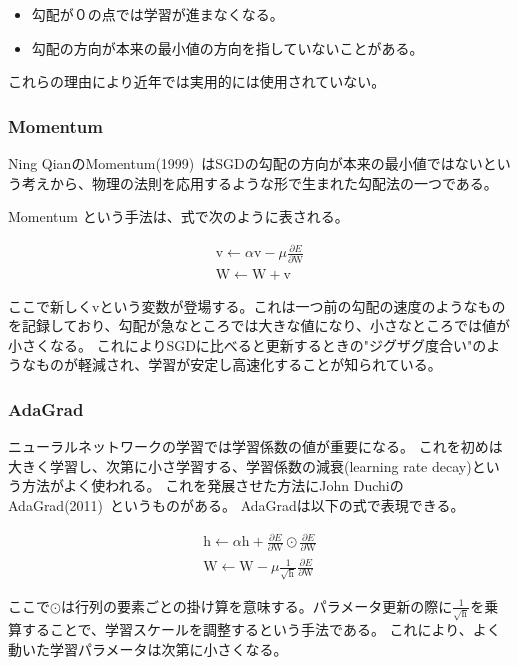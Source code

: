 \begin{itemize}
  \item 勾配が０の点では学習が進まなくなる。
  \item 勾配の方向が本来の最小値の方向を指していないことがある。
\end{itemize}
これらの理由により近年では実用的には使用されていない。

\subsubsection{Momentum}

Ning QianのMomentum(1999)~\cite{momentum}はSGDの勾配の方向が本来の最小値ではないという考えから、物理の法則を応用するような形で生まれた勾配法の一つである。


Momentum という手法は、式で次のように表される。

\begin{eqnarray}
    \mathrm{v} \leftarrow \alpha \mathrm{v} - \mu \frac {\partial E }{\partial \mathrm{W}} \\
    \mathrm{W} \leftarrow \mathrm{W+v}
\label{eq:momentum}
\end{eqnarray}

ここで新しく$ \mathrm{v} $という変数が登場する。これは一つ前の勾配の速度のようなものを記録しており、勾配が急なところでは大きな値になり、小さなところでは値が小さくなる。
これによりSGDに比べると更新するときの"ジグザグ度合い"のようなものが軽減され、学習が安定し高速化することが知られている。


\subsubsection{AdaGrad}

ニューラルネットワークの学習では学習係数の値が重要になる。
これを初めは大きく学習し、次第に小さ学習する、学習係数の減衰(learning rate decay)という方法がよく使われる。
これを発展させた方法にJohn DuchiのAdaGrad(2011)~\cite{adagrad}というものがある。
AdaGradは以下の式で表現できる。

\begin{eqnarray}　
    \mathrm{h} \leftarrow \alpha \mathrm{h} + \frac {\partial E }{\partial \mathrm{W}} \odot \frac {\partial E }{\partial \mathrm{W}}  \\
    \mathrm{W} \leftarrow \mathrm{W}  - \mu \frac{ 1 }{\sqrt{\mathrm{h}}} \frac{ \partial E }{\partial \mathrm{W}} 
\label{eq:adagrad}
\end{eqnarray}

ここで$ \odot $は行列の要素ごとの掛け算を意味する。パラメータ更新の際に$ \frac{ 1 }{\sqrt{\mathrm{h}}} $を乗算することで、学習スケールを調整するという手法である。
これにより、よく動いた学習パラメータは次第に小さくなる。



